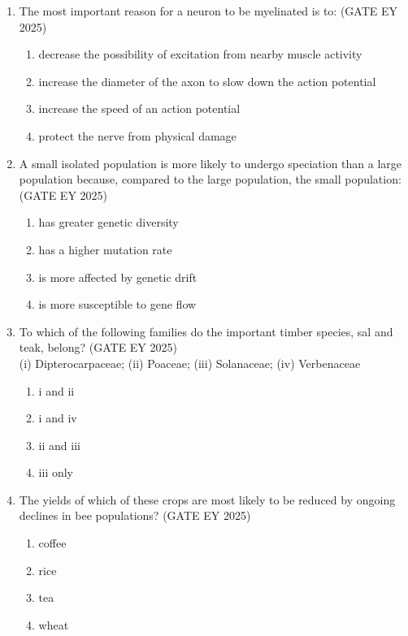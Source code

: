 \begin{enumerate}[leftmargin=*,label=\textbf{Q.\arabic*},resume]

\item The most important reason for a neuron to be myelinated is to: \hfill {(GATE EY 2025)}
\begin{multicols}{2}
\begin{enumerate}
\item decrease the possibility of excitation from nearby muscle activity
\item increase the diameter of the axon to slow down the action potential
\item increase the speed of an action potential
\item protect the nerve from physical damage
\end{enumerate}
\end{multicols}


\item A small isolated population is more likely to undergo speciation than a large population because, compared to the large population, the small population: \hfill {(GATE EY 2025)}
\begin{multicols}{2}
\begin{enumerate}
\item has greater genetic diversity
\item has a higher mutation rate
\item is more affected by genetic drift
\item is more susceptible to gene flow
\end{enumerate}
\end{multicols}


\item To which of the following families do the important timber species, sal and teak, belong? \hfill {(GATE EY 2025)} \\
(i) Dipterocarpaceae; (ii) Poaceae; (iii) Solanaceae; (iv) Verbenaceae
\begin{multicols}{2}
\begin{enumerate}
\item i and ii
\item i and iv
\item ii and iii
\item iii only
\end{enumerate}
\end{multicols}


\item The yields of which of these crops are most likely to be reduced by ongoing declines in bee populations? \hfill {(GATE EY 2025)}
\begin{multicols}{2}
\begin{enumerate}
\item coffee
\item rice
\item tea
\item wheat
\end{enumerate}
\end{multicols}



\end{enumerate}
